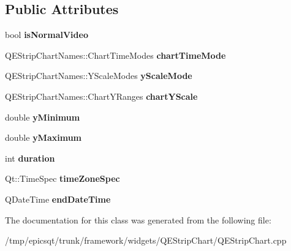 \subsection*{Public Attributes}
\begin{DoxyCompactItemize}
\item 
\hypertarget{classChartState_a1ed8e31bb4fae710bfaa3183316c5a4c}{
bool {\bfseries isNormalVideo}}
\label{classChartState_a1ed8e31bb4fae710bfaa3183316c5a4c}

\item 
\hypertarget{classChartState_af6d73102e37ed06a7aa8744b4b75b861}{
QEStripChartNames::ChartTimeModes {\bfseries chartTimeMode}}
\label{classChartState_af6d73102e37ed06a7aa8744b4b75b861}

\item 
\hypertarget{classChartState_a53eb22aabc81aae7d47981a1b77de703}{
QEStripChartNames::YScaleModes {\bfseries yScaleMode}}
\label{classChartState_a53eb22aabc81aae7d47981a1b77de703}

\item 
\hypertarget{classChartState_a6c53fb59fafb00a5ce476fd999fca105}{
QEStripChartNames::ChartYRanges {\bfseries chartYScale}}
\label{classChartState_a6c53fb59fafb00a5ce476fd999fca105}

\item 
\hypertarget{classChartState_a09fbf34aed8102ed61662b8f8ef08172}{
double {\bfseries yMinimum}}
\label{classChartState_a09fbf34aed8102ed61662b8f8ef08172}

\item 
\hypertarget{classChartState_a45e2378b9275d36155c7ab4ca5fde137}{
double {\bfseries yMaximum}}
\label{classChartState_a45e2378b9275d36155c7ab4ca5fde137}

\item 
\hypertarget{classChartState_a9c409207ee9adb5d522f21da14bd4efb}{
int {\bfseries duration}}
\label{classChartState_a9c409207ee9adb5d522f21da14bd4efb}

\item 
\hypertarget{classChartState_a1c197eb7d15cacb41972008edeb195d3}{
Qt::TimeSpec {\bfseries timeZoneSpec}}
\label{classChartState_a1c197eb7d15cacb41972008edeb195d3}

\item 
\hypertarget{classChartState_a8c2fb530924b9385c1204ce533bc1b91}{
QDateTime {\bfseries endDateTime}}
\label{classChartState_a8c2fb530924b9385c1204ce533bc1b91}

\end{DoxyCompactItemize}


The documentation for this class was generated from the following file:\begin{DoxyCompactItemize}
\item 
/tmp/epicsqt/trunk/framework/widgets/QEStripChart/QEStripChart.cpp\end{DoxyCompactItemize}
